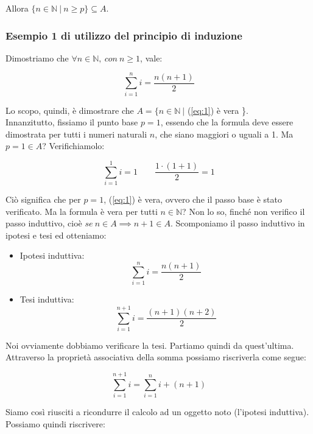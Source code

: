 \documentclass{article}
\begin{document}
\noindent Allora $\{n \in \mathbb{N} \ | \ n \geq p \} \subseteq A$.

\subsubsection{Esempio 1 di utilizzo del principio di induzione}
Dimostriamo che $\forall n \in \mathbb{N}, \ con \ n \geq 1$, vale: 

\begin{equation}
    \sum_{i = 1}^n i = \frac{n (n + 1)}{2}
\label{eq:1}
\end{equation}

\noindent Lo scopo, quindi, è dimostrare che $A = \{ n \in \mathbb{N} \ |$ (\ref{eq:1}) è vera \}.\\

\noindent Innanzitutto, fissiamo il punto base $p = 1$, essendo che la formula deve essere dimostrata per tutti i numeri naturali $n$, che siano maggiori o uguali a 1. Ma $p = 1 \in A$? Verifichiamolo:

\begin{equation*}
    \sum_{i = 1}^1 i = 1 \qquad \frac{1 \cdot (1 + 1)}{2} = 1
\end{equation*}

\noindent Ciò significa che per $p = 1$, (\ref{eq:1}) è vera, ovvero che il passo base è stato verificato. Ma la formula è vera per tutti $n \in \mathbb{N}$? Non lo so, finché non verifico il passo induttivo, cioè $se \ n \in A \implies n+1 \in A$. Scomponiamo il passo induttivo in ipotesi e tesi ed otteniamo: 

\begin{itemize}
    \item Ipotesi induttiva: $$\sum_{i = 1}^n i = \dfrac{n(n+1)}{2}$$
    \item Tesi induttiva: $$\sum_{i = 1}^{n+1} i = \dfrac{(n+1)(n+2)}{2}$$
\end{itemize}

\noindent Noi ovviamente dobbiamo verificare la tesi. Partiamo quindi da quest'ultima. Attraverso la proprietà associativa della somma possiamo riscriverla come segue:

\begin{equation*}
    \sum_{i = 1}^{n+1} i = \sum_{i = 1}^n i + (n + 1)
\end{equation*}

\noindent Siamo così riusciti a ricondurre il calcolo ad un oggetto noto (l'ipotesi induttiva). Possiamo quindi riscrivere: 
\end{document}
